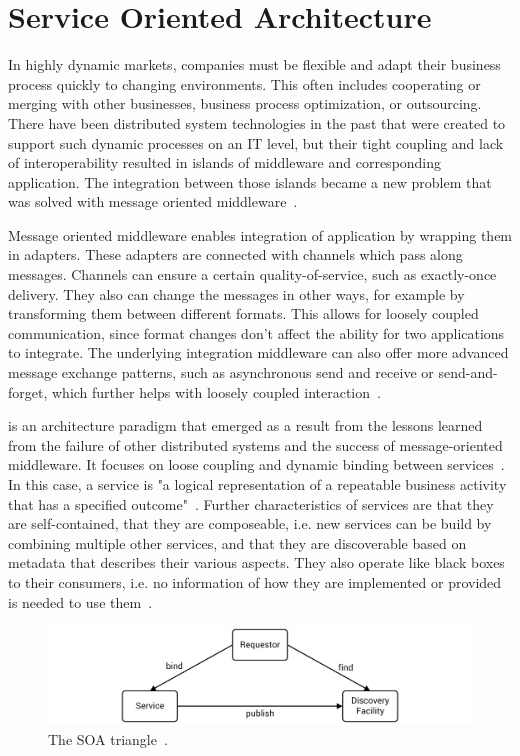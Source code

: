 \section{Service Oriented Architecture}
\label{fundamentals:service}

In highly dynamic markets, companies must be flexible and adapt their business process quickly to changing environments.
This often includes cooperating or merging with other businesses, business process optimization, or outsourcing.
There have been distributed system technologies in the past that were created to support such dynamic processes on an IT level, but their tight coupling and lack of interoperability resulted in islands of middleware and corresponding application.
The integration between those islands became a new problem that was solved with message oriented middleware~\autocite{webservices}.

Message oriented middleware enables integration of application by wrapping them in adapters.
These adapters are connected with channels which pass along messages.
Channels can ensure a certain quality-of-service, such as exactly-once delivery.
They also can change the messages in other ways, for example by transforming them between different formats.
This allows for loosely coupled communication, since format changes don't affect the ability for two applications to integrate.
The underlying integration middleware can also offer more advanced message exchange patterns, such as asynchronous send and receive or send-and-forget, which further helps with loosely coupled interaction~\autocite{webservices}.

 is an architecture paradigm that emerged as a result from the lessons learned from the failure of other distributed systems and the success of message-oriented middleware.
It focuses on loose coupling and dynamic binding between services~\autocite{webservices}.
In this case, a service is "a logical representation of a repeatable business activity that has a specified outcome"~\autocite{soa}.
Further characteristics of services are that they are self-contained, that they are composeable, i.e. new services can be build by combining multiple other services, and that they are discoverable based on metadata that describes their various aspects.
They also operate like black boxes to their consumers, i.e. no information of how they are implemented or provided is needed to use them~\autocite{webservices}.

\begin{figure}[!htbp]
	\centering
	\includegraphics[resolution=600]{fundamentals/assets/triangle}
	\caption{The SOA triangle~\autocite[based on][]{webservices}.}
	\label{image:triangle}
\end{figure}

